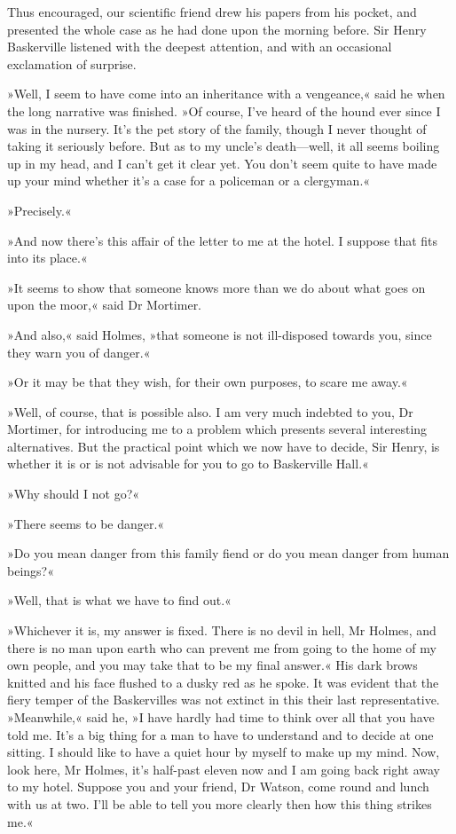 Thus encouraged, our scientific friend drew his papers from his pocket, and presented the whole case as he had done upon the morning before. Sir Henry Baskerville listened with the deepest attention, and with an occasional exclamation of surprise.

»Well, I seem to have come into an inheritance with a vengeance,« said he when the long narrative was finished. »Of course, I've heard of the hound ever since I was in the nursery. It's the pet story of the family, though I never thought of taking it seriously before. But as to my uncle's death—well, it all seems boiling up in my head, and I can't get it clear yet. You don't seem quite to have made up your mind whether it's a case for a policeman or a clergyman.«

»Precisely.«

»And now there's this affair of the letter to me at the hotel. I suppose that fits into its place.«

»It seems to show that someone knows more than we do about what goes on upon the moor,« said Dr Mortimer.

»And also,« said Holmes, »that someone is not ill-disposed towards you, since they warn you of danger.«

»Or it may be that they wish, for their own purposes, to scare me away.«

»Well, of course, that is possible also. I am very much indebted to you, Dr Mortimer, for introducing me to a problem which presents several interesting alternatives. But the practical point which we now have to decide, Sir Henry, is whether it is or is not advisable for you to go to Baskerville Hall.«

»Why should I not go?«

»There seems to be danger.«

»Do you mean danger from this family fiend or do you mean danger from human beings?«

»Well, that is what we have to find out.«

»Whichever it is, my answer is fixed. There is no devil in hell, Mr Holmes, and there is no man upon earth who can prevent me from going to the home of my own people, and you may take that to be my final answer.« His dark brows knitted and his face flushed to a dusky red as he spoke. It was evident that the fiery temper of the Baskervilles was not extinct in this their last representative. »Meanwhile,« said he, »I have hardly had time to think over all that you have told me. It's a big thing for a man to have to understand and to decide at one sitting. I should like to have a quiet hour by myself to make up my mind. Now, look here, Mr Holmes, it's half-past eleven now and I am going back right away to my hotel. Suppose you and your friend, Dr Watson, come round and lunch with us at two. I'll be able to tell you more clearly then how this thing strikes me.«


